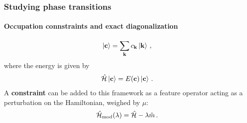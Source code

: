 \documentclass[aspectratio=169]{beamer}
\renewcommand\emph[1]{\textcolor{ugent_blue}{\textbf{#1}}}
\begin{document}
\begin{frame}
  \frametitle{Studying phase transitions}
  \framesubtitle{Occupation connstraints and exact diagonalization}
  \begin{equation}
    \ket{\vb{c}} = \sum_{\vb{k}}c_{\vb{k}}\ket{\vb{k}}\thinspace ,
    \label{eq:fock_space}
  \end{equation}
  where the energy is given by
  \begin{equation}
    \hat{\mathcal{H}} \ket{\vb{c}} = E(\vb{c}) \ket{\vb{c}} \thinspace .
    \label{eq:FCI_energy}
  \end{equation}
  A \emph{constraint} can be added to this framework as a feature operator acting as a perturbation on the Hamiltonian, weighed by $\mu$:
  \begin{equation} \label{eq:modified_hamiltonian}
    \hat{\mathcal{H}}_{\text{mod}}(\lambda) = \hat{\mathcal{H}} - \lambda \hat{m} \thinspace .
  \end{equation}
\end{frame}
\end{document}
